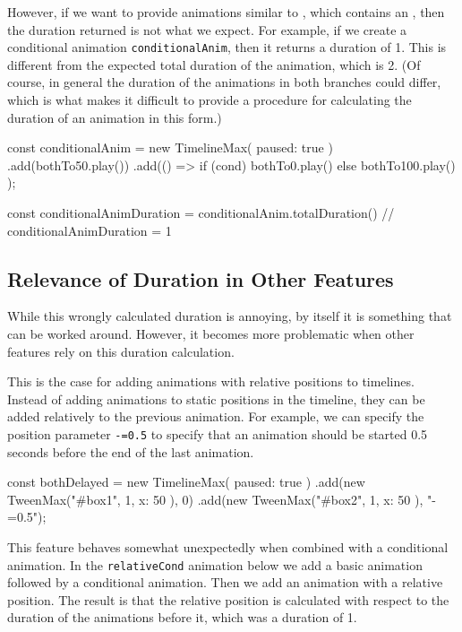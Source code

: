 However, if we want to provide animations similar to , which
contains an , then the duration returned is not what we
expect. For example, if we create a conditional animation
\texttt{conditionalAnim}, then it returns a duration of 1. This is different
from the expected total duration of the animation, which is 2. (Of course, in
general the duration of the animations in both branches could differ, which is
what makes it difficult to provide a procedure for calculating the duration of
an animation in this form.)

\begin{js}
const conditionalAnim = new TimelineMax({ paused: true })
  .add(bothTo50.play())
  .add(() => { if (cond) { bothTo0.play()   }
               else      { bothTo100.play() } });

const conditionalAnimDuration = conditionalAnim.totalDuration()
// conditionalAnimDuration = 1
\end{js}

\subsection{Relevance of Duration in Other Features}

While this wrongly calculated duration is annoying, by itself it is something
that can be worked around. However, it becomes more problematic when other
features rely on this duration calculation.

This is the case for adding animations with relative positions to timelines.
Instead of adding animations to static positions in the timeline, they can be
added relatively to the previous animation. For example, we can specify the
position parameter \texttt{-=0.5} to specify that an animation should be
started 0.5 seconds before the end of the last animation.

\begin{js}
const bothDelayed = new TimelineMax({ paused: true })
  .add(new TweenMax("#box1", 1, { x: 50 }), 0)
  .add(new TweenMax("#box2", 1, { x: 50 }), "-=0.5");
\end{js}

This feature behaves somewhat unexpectedly when combined with a
conditional animation. In the \texttt{relativeCond} animation below we add a
basic animation followed by a conditional animation. Then we add an animation
with a relative position. The result is that the relative position is
calculated with respect to the duration of the animations before it, which was
a duration of 1.


